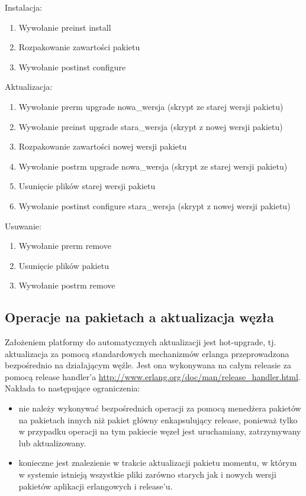 \documentclass[polish,12pt]{aghthesis}
\begin{document}
Instalacja:
\begin{enumerate}
\item Wywołanie preinst install
\item Rozpakowanie zawartości pakietu
\item Wywołanie postinst configure
\end{enumerate}
Aktualizacja:
\begin{enumerate}
\item Wywołanie prerm upgrade nowa\_wersja (skrypt ze starej wersji pakietu)
\item Wywołanie preinst upgrade stara\_wersja (skrypt z nowej wersji pakietu)
\item Rozpakowanie zawartości nowej wersji pakietu
\item Wywołanie postrm upgrade nowa\_wersja (skrypt ze starej wersji pakietu)
\item Usunięcie plików starej wersji pakietu
\item Wywołanie postinst configure stara\_wersja (skrypt z nowej wersji pakietu)
\end{enumerate}
Usuwanie:
\begin{enumerate}
\item Wywołanie prerm remove
\item Usunięcie plików pakietu
\item Wywołanie postrm remove
\end{enumerate}

\subsection{Operacje na pakietach a aktualizacja węzła}

Założeniem platformy do automatycznych aktualizacji jest hot-upgrade, tj. aktualizacja za pomocą standardowych mechanizmów erlanga przeprowadzona bezpośrednio na działającym węźle. Jest ona wykonywana na całym releasie za pomocą  release handler'a \url{http://www.erlang.org/doc/man/release_handler.html}. Nakłada to następujące ograniczenia:
\begin{itemize}
\item nie należy wykonywać bezpośrednich operacji za pomocą menedżera pakietów na pakietach innych niż pakiet główny enkapsulujący release, ponieważ tylko w przypadku operacji na tym pakiecie węzeł jest uruchamiany, zatrzymywany lub aktualizowany.
\item konieczne jest znalezienie w trakcie aktualizacji pakietu momentu, w którym w systemie istnieją wszystkie pliki zarówno starych jak i nowych wersji pakietów aplikacji erlangowych i release'u.
\end{itemize}
\end{document}
